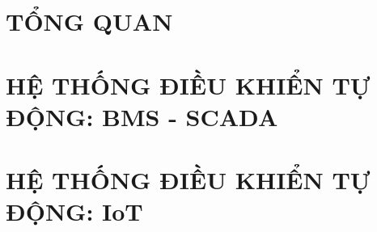 

\section{TỔNG QUAN}


\section{HỆ THỐNG ĐIỀU KHIỂN TỰ ĐỘNG: BMS - SCADA}


\section{HỆ THỐNG ĐIỀU KHIỂN TỰ ĐỘNG: IoT}


